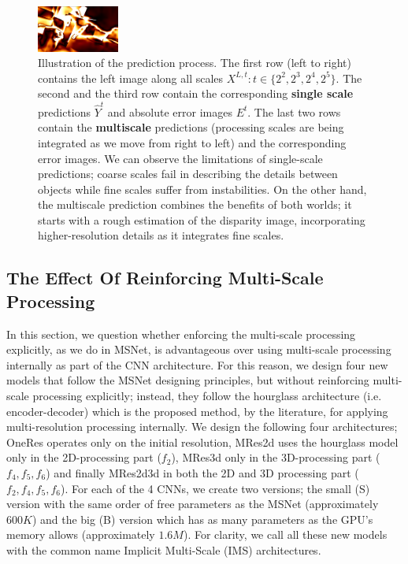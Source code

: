 \documentclass[runningheads]{llncs}
\begin{document}
\begin{figure}
\begin{center}
        \includegraphics[width=0.24\textwidth,height=0.08\textwidth,clip]{figures/pred_comb_3_err.png}
    \end{center}
    \caption{Illustration of the prediction process. The first row (left to right) contains the left image along all scales $X^{L,t} : t \in \{2^2, 2^3, 2^4, 2^5\}$. The second and the third row contain the corresponding \textbf{single scale} predictions $\hat{Y}^{t}$ and absolute error images $E^{t}$. The last two rows contain the \textbf{multiscale} predictions (processing scales are being integrated as we move from right to left) and the corresponding error images. We can observe the limitations of single-scale predictions; coarse scales fail in describing the details between objects while fine scales suffer from instabilities. On the other hand, the multiscale prediction combines the benefits of both worlds; it starts with a rough estimation of the disparity image, incorporating higher-resolution details as it integrates fine scales.}
    \label{fig:EMAPs}
\end{figure}

\subsection{The Effect Of Reinforcing Multi-Scale Processing}

In this section, we question whether enforcing the multi-scale processing explicitly, as we do in MSNet, is advantageous over using multi-scale processing internally as part of the CNN architecture. For this reason, we design four new models that follow the MSNet designing principles, but without reinforcing multi-scale processing explicitly; instead, they follow the hourglass architecture (i.e. encoder-decoder) which is the proposed method, by the literature, for applying multi-resolution processing internally. We design the following four architectures; OneRes operates only on the initial resolution, MRes2d uses the hourglass model only in the 2D-processing part ($f_2$), MRes3d only in the 3D-processing part ($f_4, f_5, f_6$) and finally MRes2d3d in both the 2D and 3D processing part ($f_2, f_4, f_5, f_6$). For each of the 4 CNNs, we create two versions; the small (S) version with the same order of free parameters as the MSNet (approximately $600K$) and the big (B) version which has as many parameters as the GPU's memory allows (approximately $1.6M$). For clarity, we call all these new models with the common name Implicit Multi-Scale (IMS) architectures.
\end{document}
